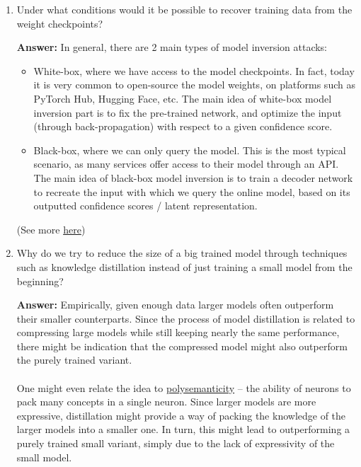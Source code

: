 \documentclass{article}
\newenvironment{QandA}{\begin{enumerate}[label=\arabic*.]}{\end{enumerate}}
\newenvironment{answer}{\par\normalfont \textbf{Answer:}}{}
\begin{document}
\begin{QandA}
    \item Under what conditions would it be possible to recover training data from the weight checkpoints?
    \begin{answer}
        In general, there are 2 main types of model inversion attacks:
        \begin{itemize}
            \item White-box, where we have access to the model checkpoints. In fact, today it is very common to open-source the model weights, on platforms such as PyTorch Hub, Hugging Face, etc. The main idea of white-box model inversion part is to fix the pre-trained network, and optimize the input (through back-propagation) with respect to a given confidence score.
            \item Black-box, where we can only query the model. This is the most typical scenario, as many services offer access to their model through an API. The main idea of black-box model inversion is to train a decoder network to recreate the input with which we query the online model, based on its outputted confidence scores / latent representation. 
        \end{itemize}
        
        (See more \href{https://blog.openmined.org/extracting-private-data-from-a-neural-network/}{here})
    \end{answer}

    \item Why do we try to reduce the size of a big trained model through techniques such as knowledge distillation instead of just training a small model from the beginning?
    \begin{answer}
        Empirically, given enough data larger models often outperform their smaller counterparts. Since the process of model distillation is related to compressing large models while still keeping nearly the same performance, there might be indication that the compressed model might also outperform the purely trained variant. \\\\
        One might even relate the idea to \href{https://twitter.com/AnthropicAI/status/1570087876053942272}{polysemanticity} -- the ability of neurons to pack many concepts in a single neuron. Since larger models are more expressive, distillation might provide a way of packing the knowledge of the larger models into a smaller one. In turn, this might lead to outperforming a purely trained small variant, simply due to the lack of expressivity of the small model. 
    \end{answer}
    
\end{QandA}
\end{document}
